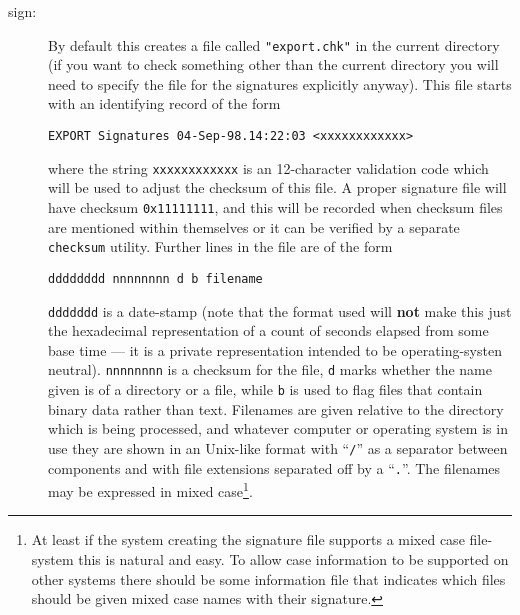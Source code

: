 \begin{description}
\item[sign:] By default this creates a file called {\tt "export.chk"} in
the current directory (if you want to check something other than the
current directory you will need to specify the file for the signatures
explicitly anyway).  This file starts with an identifying record of the
form
\begin{verbatim}
EXPORT Signatures 04-Sep-98.14:22:03 <xxxxxxxxxxxx>
\end{verbatim}
\noindent where the string \verb.xxxxxxxxxxxx. is an 12-character
validation code which will be used to adjust the checksum of this file.
A proper signature file will have checksum {\tt 0x11111111},
and this will be recorded when checksum files are mentioned within
themselves or it can be verified by a separate {\tt checksum}
utility. Further lines in the file are of the form
\begin{verbatim}
dddddddd nnnnnnnn d b filename
\end{verbatim}
\noindent \verb.ddddddd. is a date-stamp (note that the format used
will {\bf not} make this just the hexadecimal representation of a count of
seconds elapsed from some base time --- it is a private representation
intended to be operating-systen neutral). \verb.nnnnnnnn. is a checksum
for the file, \verb.d. marks whether the name given is of a directory or
a file, while \verb.b. is used to flag files that contain binary data
rather than text.  Filenames are given relative to the directory which is
being processed, and whatever computer or operating system is in use they
are shown in an Unix-like format with ``{\tt /}'' as a separator between
components and with file extensions separated off by a ``{\tt .}''. The
filenames may be expressed in mixed case\footnote{At least if the system
creating the signature file supports a mixed case file-system this is
natural and easy. To allow case information to be supported on other
systems there should be some information file that indicates which files
should be given mixed case names with their signature.}.


\end{description}
